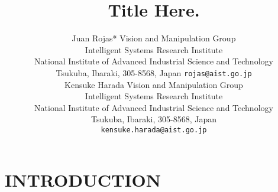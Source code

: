 \documentclass[a4paper, 10pt, conference]{ieeeconf}        %
\title{\LARGE \bf Title Here.}
\author{ \parbox{3 in}{ \centering Juan Rojas*
          Vision and Manipulation Group\\
          Intelligent Systems Research Institute\\
          National Institute of Advanced Industrial Science and Technology\\
          Tsukuba, Ibaraki, 305-8568, Japan
          {\tt rojas@aist.go.jp}}
          \hspace*{ 0.5 in}
	      \parbox{3 in}{ \centering Kensuke Harada
	       Vision and Manipulation Group\\
	       Intelligent Systems Research Institute\\
	       National Institute of Advanced Industrial Science and Technology\\
	       Tsukuba, Ibaraki, 305-8568, Japan\\
	      {\tt kensuke.harada@aist.go.jp}}
}
\begin{document}
\maketitle
\thispagestyle{empty}
\pagestyle{empty}

\begin{abstract}

\lipsum[2-3]
\end{abstract}

\section{INTRODUCTION}
%
%
\end{document}
